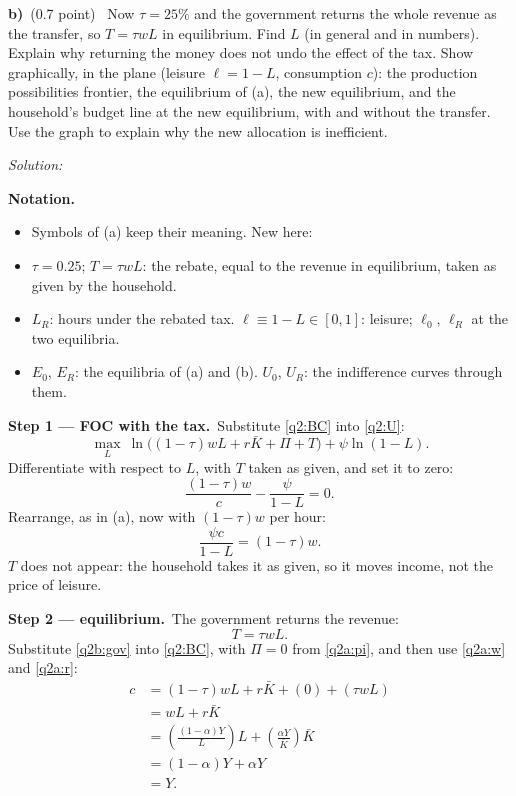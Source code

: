\documentclass[11pt,a4paper]{article}
\newif\ifsolucoes
\newcommand{\espacoresol}{6cm}
\newcommand{\parte}[2]{\par\Needspace{6\baselineskip}\medskip\noindent\textbf{#1)}~(#2)~}
\newcommand{\resolespaco}{\ifsolucoes\else\par\textit{Solution:}\vspace{\espacoresol}\par\fi}
\newcommand{\passo}[2]{\par\smallskip\noindent\textbf{Step #1.}~#2}
\newenvironment{notacao}{\par\smallskip\noindent\textbf{Notation.}\begin{itemize}[leftmargin=1.4em,topsep=1pt,itemsep=0pt]\small}{\end{itemize}}
\begin{document}
\parte{b}{0.7 point} Now $\tau=25\%$ and the government returns the whole revenue as the transfer, so
$T=\tau wL$ in equilibrium. Find $L$ (in general and in numbers). Explain why returning the money does not undo
the effect of the tax. Show graphically, in the plane (leisure $\ell=1-L$, consumption $c$): the production
possibilities frontier, the equilibrium of (a), the new equilibrium, and the household's budget line at the new
equilibrium, with and without the transfer. Use the graph to explain why the new allocation is inefficient.
\resolespaco
\begin{sol}
\begin{notacao}
\item Symbols of (a) keep their meaning. New here:
\item $\tau=0.25$; $T=\tau wL$: the rebate, equal to the revenue in equilibrium, taken as given by the household.
\item $L_R$: hours under the rebated tax. $\ell\equiv1-L\in[0,1]$: leisure; $\ell_0$, $\ell_R$ at the two equilibria.
\item $E_0$, $E_R$: the equilibria of (a) and (b). $U_0$, $U_R$: the indifference curves through them.
\end{notacao}
\passo{1 --- FOC with the tax}{Substitute \eqref{q2:BC} into \eqref{q2:U}:
\[
\max_L\ \ln\big((1-\tau)wL+r\bar K+\Pi+T\big)+\psi\ln(1-L).
\]
Differentiate with respect to $L$, with $T$ taken as given, and set it to zero:
\[
\frac{(1-\tau)w}{c}-\frac{\psi}{1-L}=0.
\]
Rearrange, as in (a), now with $(1-\tau)w$ per hour:
\begin{equation}
\boxed{\frac{\psi c}{1-L}=(1-\tau)w}. \label{q2b:hh}
\end{equation}
$T$ does not appear: the household takes it as given, so it moves income, not the price of leisure.}
\passo{2 --- equilibrium}{The government returns the revenue:
\begin{equation}
T=\tau wL. \label{q2b:gov}
\end{equation}
Substitute \eqref{q2b:gov} into \eqref{q2:BC}, with $\Pi=0$ from \eqref{q2a:pi}, and then use \eqref{q2a:w} and
\eqref{q2a:r}:
\begin{align}
c &= (1-\tau)wL+r\bar K+(0)+(\tau wL)\nonumber\\
&= wL+r\bar K\nonumber\\
&= \left(\frac{(1-\alpha)Y}{L}\right)L+\left(\frac{\alpha Y}{\bar K}\right)\bar K\nonumber\\
&= (1-\alpha)Y+\alpha Y\nonumber\\
&= Y. \label{q2b:cY}

\end{align}}
\end{sol}
\end{document}
